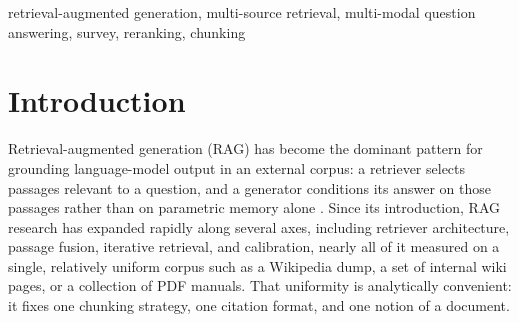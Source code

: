 \documentclass[conference]{IEEEtran}
\begin{document}
\begin{abstract}
Retrieval-augmented generation (RAG) improves a language model's output by conditioning it on passages retrieved from an external corpus, but most of this work assumes a single, roughly homogeneous document collection. Practical knowledgebases violate that assumption: websites, PDFs, video transcripts, and code repositories are extracted, chunked, cited, and queried in different ways, and one query may need to draw on several at once. This survey organizes the techniques required for grounded question answering over such heterogeneous, multi-source knowledgebases: dense retrieval and RAG foundations, hybrid lexical-dense reranking, chunking strategies for long and structured documents, modality-specific retrieval for web, video, and code, multi-document fusion, and confidence estimation with abstention. Rather than treating each technique in isolation, we examine how each is affected once a corpus is assembled from structurally different sources at query time. One system, SAGE, which ingests and answers questions over crawled websites, PDFs, video transcripts, and GitHub repositories through a shared pipeline, appears as a brief case study showing how the surveyed ideas instantiate in a working implementation. We close with open problems in cross-modal fusion, confidence calibration, incremental re-indexing, and evaluation that remain unresolved across the literature.
\end{abstract}

\begin{IEEEkeywords}
retrieval-augmented generation, multi-source retrieval, multi-modal question answering, survey, reranking, chunking
\end{IEEEkeywords}

\section{Introduction}

Retrieval-augmented generation (RAG) has become the dominant pattern for grounding language-model output in an external corpus: a retriever selects passages relevant to a question, and a generator conditions its answer on those passages rather than on parametric memory alone \cite{lewis2020rag}. Since its introduction, RAG research has expanded rapidly along several axes, including retriever architecture, passage fusion, iterative retrieval, and calibration, nearly all of it measured on a single, relatively uniform corpus such as a Wikipedia dump, a set of internal wiki pages, or a collection of PDF manuals. That uniformity is analytically convenient: it fixes one chunking strategy, one citation format, and one notion of a document.
\end{document}
